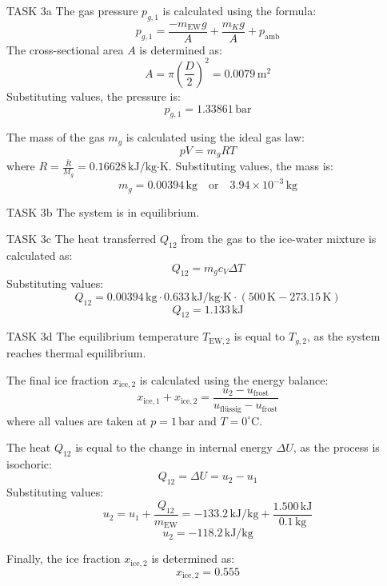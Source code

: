 TASK 3a  
The gas pressure \( p_{g,1} \) is calculated using the formula:  
\[
p_{g,1} = \frac{-m_{\text{EW}} g}{A} + \frac{m_K g}{A} + p_{\text{amb}}
\]  
The cross-sectional area \( A \) is determined as:  
\[
A = \pi \left(\frac{D}{2}\right)^2 = 0.0079 \, \text{m}^2
\]  
Substituting values, the pressure is:  
\[
p_{g,1} = 1.33861 \, \text{bar}
\]  

The mass of the gas \( m_g \) is calculated using the ideal gas law:  
\[
p V = m_g R T
\]  
where \( R = \frac{\bar{R}}{M_g} = 0.16628 \, \text{kJ/kg·K} \).  
Substituting values, the mass is:  
\[
m_g = 0.00394 \, \text{kg} \quad \text{or} \quad 3.94 \times 10^{-3} \, \text{kg}
\]  

TASK 3b  
The system is in equilibrium.

TASK 3c  
The heat transferred \( Q_{12} \) from the gas to the ice-water mixture is calculated as:  
\[
Q_{12} = m_g c_V \Delta T
\]  
Substituting values:  
\[
Q_{12} = 0.00394 \, \text{kg} \cdot 0.633 \, \text{kJ/kg·K} \cdot (500 \, \text{K} - 273.15 \, \text{K})
\]  
\[
Q_{12} = 1.133 \, \text{kJ}
\]  

TASK 3d  
The equilibrium temperature \( T_{\text{EW},2} \) is equal to \( T_{g,2} \), as the system reaches thermal equilibrium.  

The final ice fraction \( x_{\text{ice},2} \) is calculated using the energy balance:  
\[
x_{\text{ice},1} + x_{\text{ice},2} = \frac{u_2 - u_{\text{frost}}}{u_{\text{flüssig}} - u_{\text{frost}}}
\]  
where all values are taken at \( p = 1 \, \text{bar} \) and \( T = 0^\circ\text{C} \).  

The heat \( Q_{12} \) is equal to the change in internal energy \( \Delta U \), as the process is isochoric:  
\[
Q_{12} = \Delta U = u_2 - u_1
\]  
Substituting values:  
\[
u_2 = u_1 + \frac{Q_{12}}{m_{\text{EW}}} = -133.2 \, \text{kJ/kg} + \frac{1.500 \, \text{kJ}}{0.1 \, \text{kg}}
\]  
\[
u_2 = -118.2 \, \text{kJ/kg}
\]  

Finally, the ice fraction \( x_{\text{ice},2} \) is determined as:  
\[
x_{\text{ice},2} = 0.555
\]